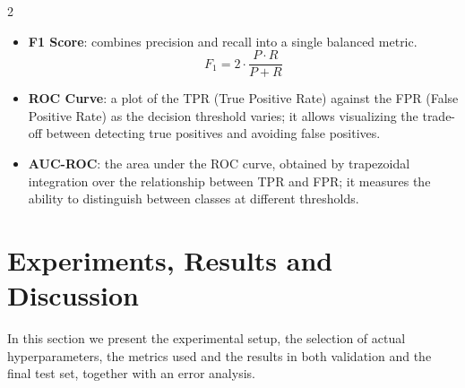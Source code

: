 \documentclass[11pt]{article}
\begin{document}
\begin{multicols}{2}
\begin{itemize}
    \item \textbf{F1 Score}: combines precision and recall into a single balanced metric.
    \vspace{-0.5em}
    \begin{equation}
        \textstyle F_1 = 2 \cdot \frac{P \cdot R}{P + R} \label{eq: F-score}
    \end{equation}

    \item \textbf{ROC Curve}: a plot of the TPR (True Positive Rate) against the FPR (False Positive Rate) as the decision threshold varies; it allows visualizing the trade-off between detecting true positives and avoiding false positives.
    \label{met: ROC}

    \item \textbf{AUC-ROC}: the area under the ROC curve, obtained by trapezoidal integration over the relationship between TPR and FPR; it measures the ability to distinguish between classes at different thresholds.

\end{itemize}

\vspace{-0.5em}

\end{multicols}


\vspace{1em}
\section{Experiments, Results and Discussion}

In this section we present the experimental setup, the selection of actual hyperparameters, the metrics used and the results in both validation and the final test set, together with an error analysis.
\end{document}
